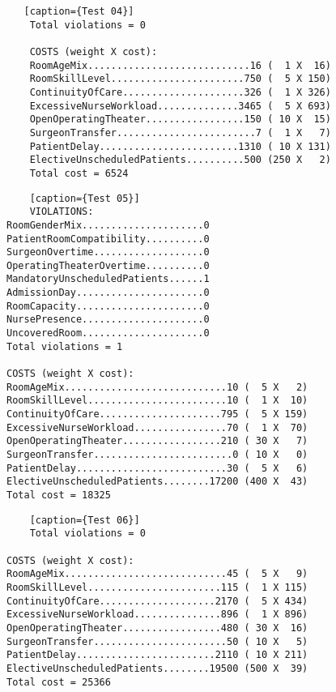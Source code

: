 \begin{lstlisting}   [caption={Test 04}]
    Total violations = 0
    
    COSTS (weight X cost): 
    RoomAgeMix............................16 (  1 X  16)
    RoomSkillLevel.......................750 (  5 X 150)
    ContinuityOfCare.....................326 (  1 X 326)
    ExcessiveNurseWorkload..............3465 (  5 X 693)
    OpenOperatingTheater.................150 ( 10 X  15)
    SurgeonTransfer........................7 (  1 X   7)
    PatientDelay........................1310 ( 10 X 131)
    ElectiveUnscheduledPatients..........500 (250 X   2)
    Total cost = 6524
\end{lstlisting}

\begin{lstlisting}
    [caption={Test 05}]
    VIOLATIONS: 
RoomGenderMix.....................0
PatientRoomCompatibility..........0
SurgeonOvertime...................0
OperatingTheaterOvertime..........0
MandatoryUnscheduledPatients......1
AdmissionDay......................0
RoomCapacity......................0
NursePresence.....................0
UncoveredRoom.....................0
Total violations = 1

COSTS (weight X cost): 
RoomAgeMix............................10 (  5 X   2)
RoomSkillLevel........................10 (  1 X  10)
ContinuityOfCare.....................795 (  5 X 159)
ExcessiveNurseWorkload................70 (  1 X  70)
OpenOperatingTheater.................210 ( 30 X   7)
SurgeonTransfer........................0 ( 10 X   0)
PatientDelay..........................30 (  5 X   6)
ElectiveUnscheduledPatients........17200 (400 X  43)
Total cost = 18325
\end{lstlisting}

\begin{lstlisting}
    [caption={Test 06}]
    Total violations = 0

COSTS (weight X cost): 
RoomAgeMix............................45 (  5 X   9)
RoomSkillLevel.......................115 (  1 X 115)
ContinuityOfCare....................2170 (  5 X 434)
ExcessiveNurseWorkload...............896 (  1 X 896)
OpenOperatingTheater.................480 ( 30 X  16)
SurgeonTransfer.......................50 ( 10 X   5)
PatientDelay........................2110 ( 10 X 211)
ElectiveUnscheduledPatients........19500 (500 X  39)
Total cost = 25366
\end{lstlisting}